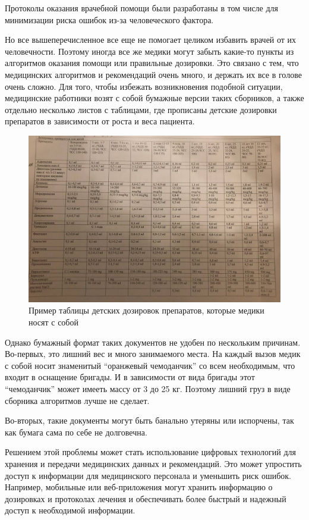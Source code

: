Протоколы оказания врачебной помощи были разработаны в том числе для минимизации риска ошибок из-за человеческого фактора.

Но все вышеперечисленное все еще не помогает целиком избавить врачей от их человечности. Поэтому иногда все же медики могут забыть какие-то пункты из алгоритмов оказания помощи или правильные дозировки. Это связано с тем, что медицинских алгоритмов и рекомендаций очень много, и держать их все в голове очень сложно. Для того, чтобы избежать возникновения подобной ситуации, медицинские работники возят с собой бумажные версии таких сборников, а также отдельно несколько листов с таблицами, где прописаны детские дозировки препаратов в зависимости от роста и веса пациента. 

\begin{figure}
  \includegraphics[scale=0.35]{inc/таблица детских дозировок.jpg}
  \caption{Пример таблицы детских дозировок препаратов, которые медики носят с собой}
  \label{fig:fig01}
\end{figure}


Однако бумажный формат таких документов не удобен по нескольким причинам. Во-первых, это лишний вес и много занимаемого места. На каждый вызов медик с собой носит знаменитый “оранжевый чемоданчик” со всем необходимым, что входит в оснащение бригады. И в зависимости от вида бригады этот “чемоданчик” может имееть массу от 3 до 25 кг. Поэтому лишний груз в виде сборника алгоритмов лучше не сделает.

Во-вторых, такие документы могут быть банально утеряны или испорчены, так как бумага сама по себе не долговечна.

Решением этой проблемы может стать использование цифровых технологий для хранения и передачи медицинских данных и рекомендаций. Это может упростить доступ к информации для медицинского персонала и уменьшить риск ошибок. Например, мобильные или веб-приложения могут хранить информацию о дозировках и протоколах лечения и обеспечивать более быстрый и надежный доступ к необходимой информации.

